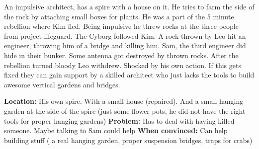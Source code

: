 \begin{npcBox}[title=Leo]
    \begin{stressSection}
    \end{stressSection}
    \begin{tabularx}{\textwidth}{ XX }
    \end{tabularx}

    \begin{consequences}
    \item {}
    \item {}
    \item {}
    \end{consequences}

    \begin{npcDescription}
    An impulsive architect, has a spire with a house on it. He tries to farm the side of the rock by attaching small boxes for plants.
    He was a part of the 5 minute rebellion where Kim fled. Being impulsive he threw rocks at the three people from project lifeguard. The Cyborg followed Kim. A rock thrown by Leo hit an engineer, throwing him of a bridge and killing him. Sam, the third engineer did hide in their bunker. Some antenna got destroyed by thrown rocks.
    After the rebellion turned bloody Leo withdrew. Shocked by his own action.
    If this gets fixed they can gain support by a skilled architect who just lacks the tools to build awesome vertical gardens and bridges.

    \textbf{Location:} His own spire. With a small house (repaired). And a small hanging garden at the side of the spire (just some flower pots, he did not have the right tools for proper hanging gardens)
    \textbf{Problem:} Has to deal with having killed someone. Maybe talking to Sam could help
    \textbf{When convinced:} Can help building stuff ( a real hanging garden, proper suspension bridges, traps for crabs)
    \end{npcDescription}

\end{npcBox}

\newpage

